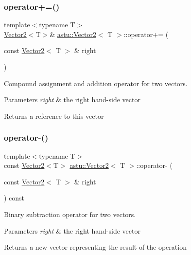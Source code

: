 \subsubsection{\texorpdfstring{operator+=()}{operator+=()}}
{\footnotesize\ttfamily template$<$typename T$>$ \\
\hyperlink{classastu_1_1Vector2}{Vector2}$<$T$>$\& \hyperlink{classastu_1_1Vector2}{astu\+::\+Vector2}$<$ T $>$\+::operator+= (\begin{DoxyParamCaption}\item[{const \hyperlink{classastu_1_1Vector2}{Vector2}$<$ T $>$ \&}]{right }\end{DoxyParamCaption})\hspace{0.3cm}{\ttfamily [inline]}}

Compound assignment and addition operator for two vectors.


\begin{DoxyParams}{Parameters}
{\em right} & the right hand-\/side vector \\
\hline
\end{DoxyParams}
\begin{DoxyReturn}{Returns}
a reference to this vector 
\end{DoxyReturn}
\mbox{\label{classastu_1_1Vector2_a694ff874fcdb2118ed665a7cb28978e9}} 
\subsubsection{\texorpdfstring{operator-\/()}{operator-()}\hspace{0.1cm}{\footnotesize\ttfamily [1/2]}}
{\footnotesize\ttfamily template$<$typename T$>$ \\
const \hyperlink{classastu_1_1Vector2}{Vector2}$<$T$>$ \hyperlink{classastu_1_1Vector2}{astu\+::\+Vector2}$<$ T $>$\+::operator-\/ (\begin{DoxyParamCaption}\item[{const \hyperlink{classastu_1_1Vector2}{Vector2}$<$ T $>$ \&}]{right }\end{DoxyParamCaption}) const\hspace{0.3cm}{\ttfamily [inline]}}

Binary subtraction operator for two vectors.


\begin{DoxyParams}{Parameters}
{\em right} & the right hand-\/side vector \\
\hline
\end{DoxyParams}
\begin{DoxyReturn}{Returns}
a new vector representing the result of the operation 
\end{DoxyReturn}
\mbox{\label{classastu_1_1Vector2_aaa65baf8ffd013a0401c4875d91337a4}} 
